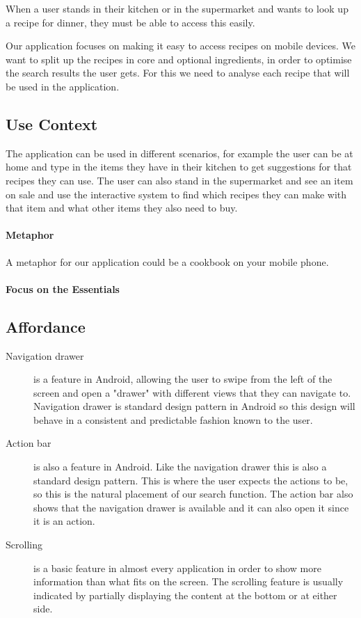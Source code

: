 When a user stands in their kitchen or in the supermarket and wants to look up a recipe for dinner, they must be able to access this easily.

Our application focuses on making it easy to access recipes on mobile devices. We want to split up the recipes in core and optional ingredients, in order to optimise the search results the user gets. For this we need to analyse each recipe that will be used in the application.

\subsection*{Use Context}

The application can be used in different scenarios, for example the user can be at home and type in the items they have in their kitchen to get suggestions for that recipes they can use. The user can also stand in the supermarket and see an item on sale and use the interactive system to find which recipes they can make with that item and what other items they also need to buy. 

\paragraph{Metaphor}

A metaphor for our application could be a cookbook on your mobile phone. 

\paragraph{Focus on the Essentials}

\subsection*{Affordance}

\begin{description}

\item [Navigation drawer] is a feature in Android, allowing the user to swipe from the left of the screen and open a "drawer" with different views that they can navigate to. Navigation drawer is standard design pattern in Android so this design will behave in a consistent and predictable fashion known to the user.
\item [Action bar] is also a feature in Android. Like the navigation drawer this is also a standard design pattern. This is where the user expects the actions to be, so this is the natural placement of our search function. The action bar also shows that the navigation drawer is available and it can also open it since it is an action. 
\item[Scrolling] is a basic feature in almost every application in order to show more information than what fits on the screen. The scrolling feature is usually indicated by partially displaying the content at the bottom or at either side.

\end{description}

